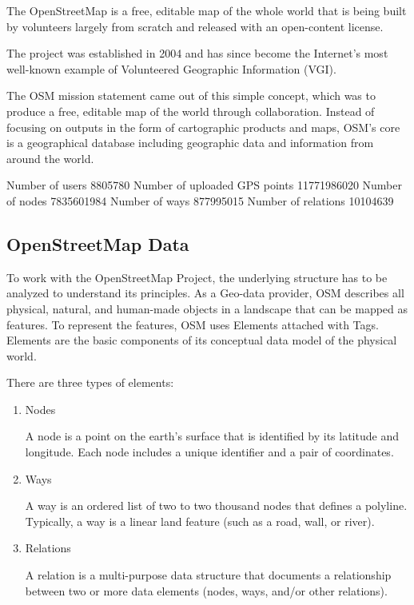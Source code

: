 The OpenStreetMap is a free, editable map of the whole world that is being built by volunteers largely from scratch and released with an open-content license. 
\autocite[]{wiki:about}

The project was established in 2004 and has since become the Internet's most well-known example of Volunteered Geographic Information (VGI). \autocite[]{JokarArsanjani2015} 

The OSM mission statement came out of this simple concept, which was to produce a free, editable map of the world through collaboration. Instead of focusing on outputs in the form of cartographic products and maps, OSM's core is a geographical database including geographic data and information from around the world. \autocite[]{Antoniou2017}

Number of users	8805780
Number of uploaded GPS points	11771986020
Number of nodes	7835601984
Number of ways	877995015
Number of relations	10104639


\subsection{OpenStreetMap Data}

To work with the OpenStreetMap Project, the underlying structure has to be analyzed to understand its principles. As a Geo-data provider, OSM describes all physical, natural, and human-made objects in a landscape that can be mapped as features. To represent the features, OSM uses Elements attached with Tags. Elements are the basic components of its conceptual data model of the physical world.    

There are three types of elements:

\begin{enumerate}
    \item Nodes
    
    A node is a point on the earth's surface that is identified by its latitude and longitude. Each node includes a unique identifier and a pair of coordinates. 
    
    \item Ways
    
    A way is an ordered list of two to two thousand nodes that defines a polyline. Typically, a way is a linear land feature (such as a road, wall, or river).
    
    \item Relations
    
    A relation is a multi-purpose data structure that documents a relationship between two or more data elements (nodes, ways, and/or other relations).
    
\end{enumerate}

